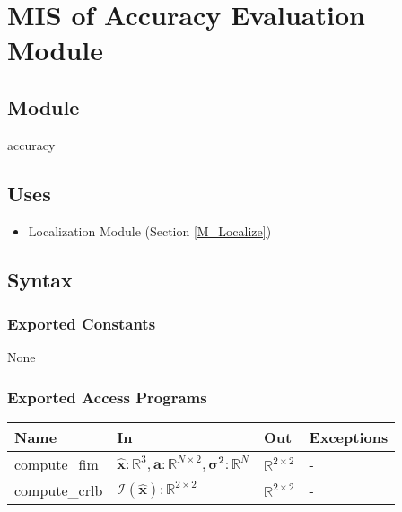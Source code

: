 \documentclass[12pt, titlepage]{article}
\begin{document}
\newpage

\section{MIS of Accuracy Evaluation Module} \label{M_Accurate}

\subsection{Module}

accuracy

\subsection{Uses}
\begin{itemize}
  \item Localization Module (Section \ref{M_Localize})
\end{itemize}


\subsection{Syntax}

\subsubsection{Exported Constants}
None

\subsubsection{Exported Access Programs}

\begin{center}
\begin{tabular}{p{4cm} p{5cm} p{4cm} p{2cm}}
\hline
\textbf{Name} & \textbf{In} & \textbf{Out} & \textbf{Exceptions} \\
\hline
compute\_fim & $\hat{\mathbf{x}}: \mathbb{R}^3, \mathbf{a}: \mathbb{R}^{N \times 2}, \boldsymbol{\sigma^2}: \mathbb{R}^N$  & $\mathbb{R}^{2 \times 2}$ & - \\
compute\_crlb & $\boldsymbol{\mathcal{I}}(\hat{\mathbf{x}}): \mathbb{R}^{2 \times 2}$ & $\mathbb{R}^{2 \times 2}$ & - \\
\hline
\end{tabular}
\end{center}
\end{document}
